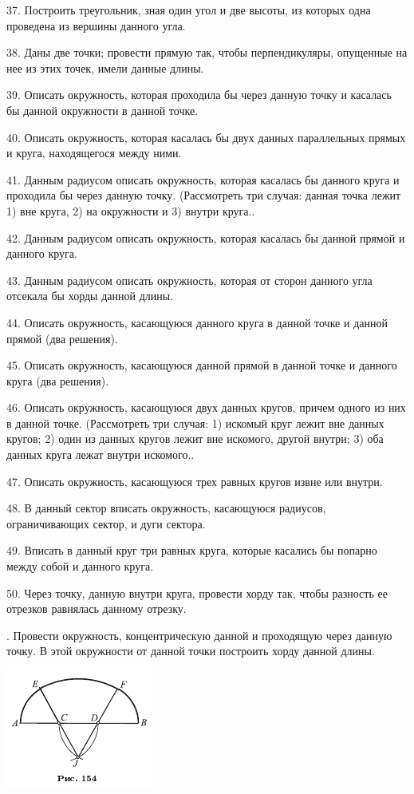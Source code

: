 \documentclass[oneside]{book}
\begin{document}
37.
Построить треугольник, зная один угол и две высоты, из которых одна проведена из вершины данного угла.

38.
Даны две точки;
провести прямую так, чтобы перпендикуляры, опущенные на нее из этих точек, имели данные длины.

39.
Описать окружность, которая проходила бы через данную точку и касалась бы данной окружности в данной точке.

40.
Описать окружность, которая касалась бы двух данных параллельных прямых и круга, находящегося между ними.

41.
Данным радиусом описать окружность, которая касалась бы данного круга и проходила бы через данную точку.
(Рассмотреть три случая:
данная точка лежит 1) вне круга, 2) на окружности и 3) внутри круга..

42.
Данным радиусом описать окружность, которая касалась бы данной прямой и данного круга.

43.
Данным радиусом описать окружность, которая от сторон данного угла отсекала бы хорды данной длины.

44.
Описать окружность, касающуюся данного круга в данной точке и данной прямой (два решения).

45.
Описать окружность, касающуюся данной прямой в данной точке и данного круга (два решения).

46.
Описать окружность, касающуюся двух данных кругов, причем одного из них в данной точке.
(Рассмотреть три случая:
1) искомый круг лежит вне данных кругов;
2) один из данных кругов лежит вне искомого, другой внутри;
3) оба данных круга лежат внутри искомого..

47.
Описать окружность, касающуюся трех равных кругов извне или внутри.

48.
В данный сектор вписать окружность, касающуюся радиусов, ограничивающих сектор, и дуги сектора.

49.
Вписать в данный круг три равных круга, которые касались бы попарно между собой и данного круга.

50.
Через точку, данную внутри круга, провести хорду так, чтобы разность ее отрезков равнялась данному отрезку.

.
Провести окружность, концентрическую данной и проходящую через данную точку.
В этой окружности от данной точки построить хорду данной длины.

\includegraphics{pics/ris-154}
\end{document}
